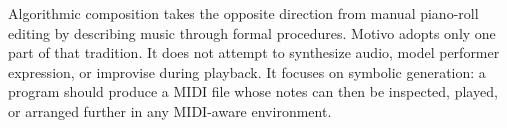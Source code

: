 Algorithmic composition takes the opposite direction from manual piano-roll editing by describing music through formal
procedures.
Motivo adopts only one part of that tradition.
It does not attempt to synthesize audio, model performer expression, or improvise during playback.
It focuses on symbolic generation: a program should produce a MIDI file whose notes can then be inspected, played, or
arranged further in any MIDI-aware environment.
